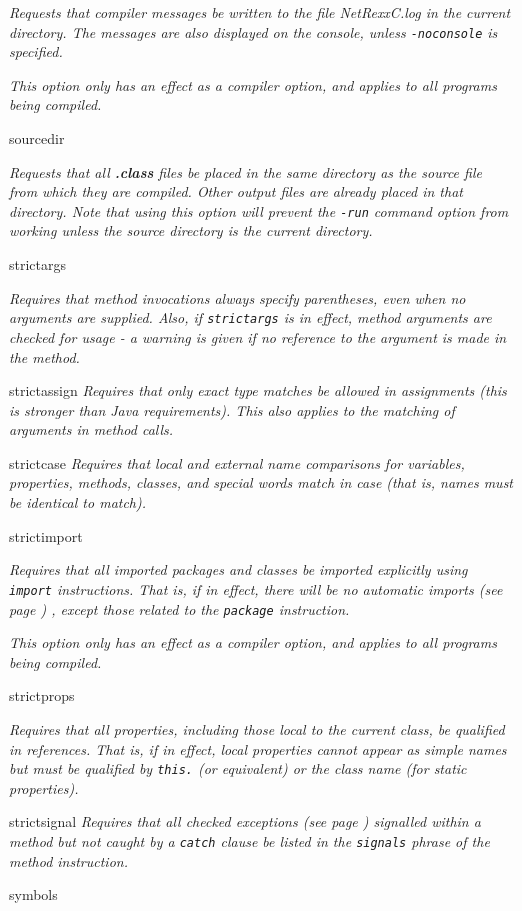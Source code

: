 \begin{description}
\emph{Requests that compiler messages be written to the file NetRexxC.log in
the current directory.
The messages are also displayed on the console, unless
\texttt{-noconsole} is specified.}
 
\emph{This option only has an effect as a compiler option, and applies to all
programs being compiled.}
\item{sourcedir}

\emph{Requests that all \textbf{.class} files be placed in the same
directory as the source file from which they are compiled.  Other output
files are already placed in that directory.
Note that using this option will prevent the \texttt{-run} command
option from working unless the source directory is the current
directory.}
\item{strictargs}

\emph{Requires that method invocations always specify parentheses, even
when no arguments are supplied.  Also, if \texttt{strictargs} is in
effect, method arguments are checked for usage - a warning is given
if no reference to the argument is made in the method.}
\item{strictassign}
\emph{Requires that only exact type matches be allowed in assignments
(this is stronger than Java requirements).
This also applies to the matching of arguments in method calls.}
\item{strictcase}
\emph{Requires that local and external name comparisons for variables,
properties, methods, classes, and special words match in case (that is,
names must be identical to match).}
\item{strictimport}

\emph{Requires that all imported packages and classes be imported
explicitly using \texttt{import} instructions.  That is, if in effect,
there will be no  automatic imports (see page \pageref{refimport}) , except those
related to the \texttt{package} instruction.}
 
\emph{This option only has an effect as a compiler option, and applies to all
programs being compiled.}
\item{strictprops}

\emph{Requires that all properties, including those local to the
current class, be qualified in references.
That is, if in effect, local properties cannot appear as simple names
but must be qualified by \texttt{this.} (or equivalent) or the class name
(for static properties).}
\item{strictsignal}
\emph{Requires that all  checked exceptions (see page \pageref{refchecked}) 
signalled within a method but not caught by a \texttt{catch} clause be
listed in the \texttt{signals} phrase of the method instruction.}
\item{symbols}


\end{description}
